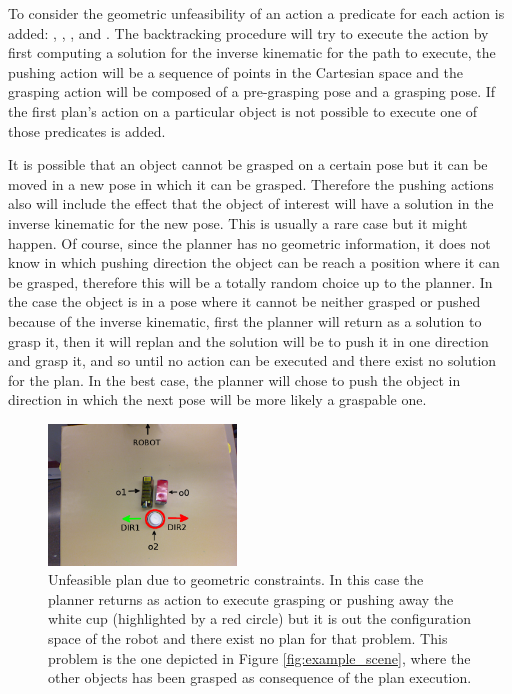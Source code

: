 To consider the geometric unfeasibility of an action a predicate for each action is added: ,  ,  , \linebreak {} and  . The backtracking procedure will try to execute the action by first computing a solution for the inverse kinematic for the path to execute, the pushing action will be a sequence of points in the Cartesian space and the grasping action will be composed of a pre-grasping pose and a grasping pose. If the first plan's action on a particular object is not possible to execute one of those predicates is added. 

It is possible that an object cannot be grasped on a certain pose but it can be moved in a new pose in which it can be grasped. Therefore the pushing actions also will include the effect that the object of interest will have a solution in the inverse kinematic for the new pose. This is usually a rare case but it might happen. Of course, since the planner has no geometric information, it does not know in which pushing direction the object can be reach a position where it can be grasped, therefore this will be a totally random choice up to the planner. In the case the object is in a pose where it cannot be neither grasped or pushed because of the inverse kinematic, first the planner will return as a solution to grasp it, then it will replan and the solution will be to push it in one direction and grasp it, and so until no action can be executed and there exist no solution for the plan. In the best case, the planner will chose to push the object in direction in which the next pose will be more likely a graspable one. 


\begin{figure}[h]
\centering
\includegraphics[width=5cm]{Img/backtracking/image4.png}
\caption{Unfeasible plan due to geometric constraints. In this case the planner returns as action to execute grasping or pushing away the white cup (highlighted by a red circle) but it is out the configuration space of the robot and there exist no plan for that problem. This problem is the one depicted in Figure \ref{fig:example_scene}, where the other objects has been grasped as consequence of the plan execution.} \label{fig:backtracking1}
\end{figure}

